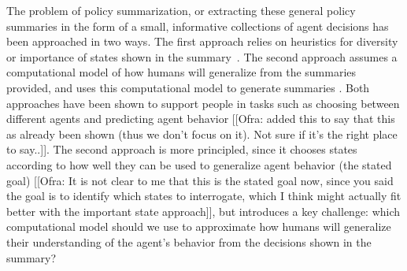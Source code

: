 \documentclass{article}
\newcommand{\comment}[2]{{\color{blue} [[{#1}: {#2}]]}}
\begin{document}


The problem of policy summarization, or extracting these general policy summaries in the form of a small, informative collections of agent decisions has been approached in two ways.  The first approach relies on heuristics for diversity or importance of states shown in the summary~\cite{amir2018highlights,huang2018establishing}. The second approach assumes a computational model of how humans will generalize from the summaries provided, and uses this computational model to generate summaries \cite{huang17communicate}.  Both approaches have been shown to support people in tasks such as choosing between different agents and predicting agent behavior \comment{Ofra}{added this to say that this as already been shown (thus we don't focus on it). Not sure if it's the right place to say..}.   The second approach is more principled, since it chooses states according to how well they can be used to generalize agent behavior (the stated goal) \comment{Ofra}{It is not clear to me that this is the stated goal now, since you said the goal is to identify which states to interrogate, which I think might actually fit better with the important state approach}, but introduces a key challenge: which computational model should we use to approximate how humans will generalize their understanding of the agent's behavior from the decisions shown in the summary?
\end{document}
